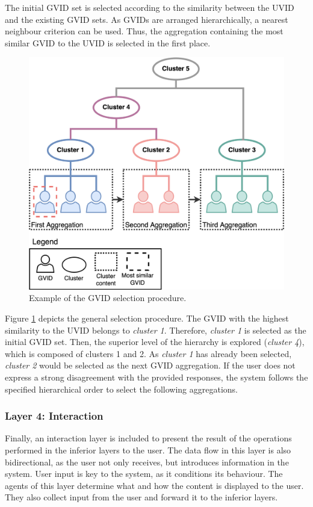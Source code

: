 \begin{itemize}
    The initial GVID set is selected according to the similarity between the UVID and the existing GVID sets. As GVIDs are arranged hierarchically, a nearest neighbour criterion can be used. Thus, the aggregation containing the most similar GVID to the UVID is selected in the first place.

    \begin{figure}[t]
        \centering
        \includegraphics[width=.65\linewidth]{6_kbsextractiondl/figures/GVID_clusters.eps}
        \caption{Example of the GVID selection procedure.}
        \label{fig:gvid_selection}
    \end{figure}
    
    Figure \ref{fig:gvid_selection} depicts the general selection procedure. The GVID with the highest similarity to the UVID belongs to \textit{cluster 1}. Therefore, \textit{cluster 1} is selected as the initial GVID set. Then, the superior level of the hierarchy is explored (\textit{cluster 4}), which is composed of clusters 1 and 2. As \textit{cluster 1} has already been selected, \textit{cluster 2} would be selected as the next GVID aggregation. If the user does not express a strong disagreement with the provided responses, the system follows the specified hierarchical order to select the following aggregations.
\end{itemize}

\subsubsection*{Layer 4: Interaction}
Finally, an interaction layer is included to present the result of the operations performed in the inferior layers to the user. The data flow in this layer is also bidirectional, as the user not only receives, but introduces information in the system. User input is key to the system, as it conditions its behaviour. The agents of this layer determine what and how the content is displayed to the user. They also collect input from the user and forward it to the inferior layers.

